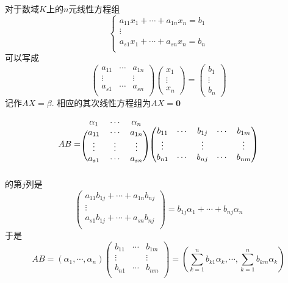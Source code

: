 \begin{Note}
对于数域$K$上的$n$元线性方程组
$$
\left\{
\begin{matrix}
a_{11} x_1 +\cdots + a_{1n} x_n = b_1 \\
\vdots \\
a_{s1} x_1 +\cdots + a_{sn} x_n = b_n \\
\end{matrix}
\right.
$$%
可以写成
\[
\begin{pmatrix} 
a_{11} & \cdots & a_{1n} \\ 
\vdots &        & \vdots \\ 
a_{s1} & \cdots & a_{sn} \\
\end{pmatrix}
\begin{pmatrix} x_1 \\ \vdots \\ x_{n} \end{pmatrix}
= 
\begin{pmatrix} b_{1} \\ \vdots \\ b_{n} \end{pmatrix}
\]
记作$AX = \beta$. 相应的其次线性方程组为$AX = \mathbf{0}$
\end{Note}

\begin{Note}
\[
A B = 
\begin{blockarray}{ccc}
\alpha_1 & \cdots & \alpha_n \\
\begin{block}{(ccc)}
a_{11} & \cdots & a_{1n} \\
\vdots & \vdots & \vdots \\
a_{s1} & \cdots & a_{sn} \\
\end{block}
\end{blockarray}
\begin{pmatrix}
b_{11} & \cdots & b_{1j} & \cdots&  b_{1m} \\
\vdots &        & \vdots &       & \vdots \\
b_{n1} & \cdots & b_{nj} & \cdots & b_{nm} \\
\end{pmatrix}
\]
的第$j$列是
\[
\begin{pmatrix}
a_{11} b_{1j} + \cdots + a_{1n} b_{nj} \\
\vdots \\
a_{s1} b_{1j} + \cdots + a_{sn} b_{nj} \\
\end{pmatrix} = b_{1j} \alpha_1 + \cdots + b_{nj} \alpha_n
\]
于是
\[ 
AB = (\alpha_1, \cdots, \alpha_n) 
\begin{pmatrix}
b_{11} & \cdots & b_{1m} \\
\vdots &        & \vdots \\
b_{n1} & \cdots & b_{nm} \\
\end{pmatrix}
= 
\left(
\sum_{k=1}^n b_{k1} \alpha_k, \cdots, \sum_{k=1}^n b_{km} \alpha_k
\right)
\]
\end{Note}


